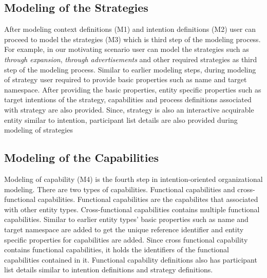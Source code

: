 \subsection{Modeling of the Strategies}
After modeling context definitions (M1) and intention definitions (M2) user can proceed to model the strategies (M3) which is third step of the modeling process. For example, in our motivating scenario user can model the strategies such as \textit{through expansion}, \textit{through advertisements} and other required strategies as third step of the modeling process. Similar to earlier modeling steps, during modeling of strategy user required to provide basic properties such as name and target namespace. After providing the basic properties, entity specific properties such as target intentions of the strategy, capabilities and process definitions associated with strategy are also provided. Since, strategy is also an interactive acquirable entity similar to intention, participant list details are also provided during modeling of strategies

\subsection{Modeling of the Capabilities}
Modeling of capability (M4) is the fourth step in intention-oriented organizational modeling. There are two types of capabilities. Functional capabilities and cross-functional capabilities. Functional capabilities are the capabilites that associated with other entity types. Cross-functional capabilities contains multiple functional capabilities. Similar to earlier entity types' basic properties such as name and target namespace are added to get the unique reference identifier and entity specific properties for capabilities are added. Since cross functional capability contains functional capabilities, it holds the identifiers of the functional capabilities contained in it. Functional capability definitions also has participant list details similar to intention definitions and strategy definitions. 


